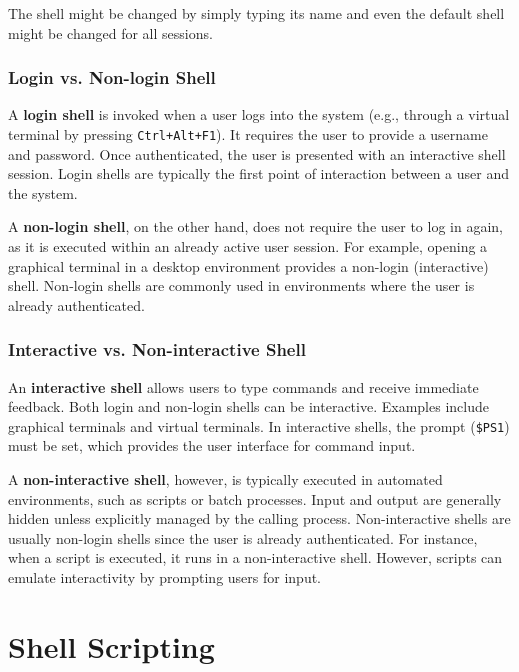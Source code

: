 \begin{tipsblock}
    The shell might be changed by simply typing its name and even the default shell might be changed for all sessions.
\end{tipsblock}

\subsubsection{Login vs. Non-login Shell}

A \textbf{login shell} is invoked when a user logs into the system (e.g., through a virtual terminal by pressing \texttt{Ctrl+Alt+F1}). It requires the user to provide a username and password. Once authenticated, the user is presented with an interactive shell session. Login shells are typically the first point of interaction between a user and the system.

A \textbf{non-login shell}, on the other hand, does not require the user to log in again, as it is executed within an already active user session. For example, opening a graphical terminal in a desktop environment provides a non-login (interactive) shell. Non-login shells are commonly used in environments where the user is already authenticated.

\subsubsection{Interactive vs. Non-interactive Shell}

An \textbf{interactive shell} allows users to type commands and receive immediate feedback. Both login and non-login shells can be interactive. Examples include graphical terminals and virtual terminals. In interactive shells, the prompt (\texttt{\$PS1}) must be set, which provides the user interface for command input.

A \textbf{non-interactive shell}, however, is typically executed in automated environments, such as scripts or batch processes. Input and output are generally hidden unless explicitly managed by the calling process. Non-interactive shells are usually non-login shells since the user is already authenticated. For instance, when a script is executed, it runs in a non-interactive shell. However, scripts can emulate interactivity by prompting users for input.

\section{Shell Scripting}


